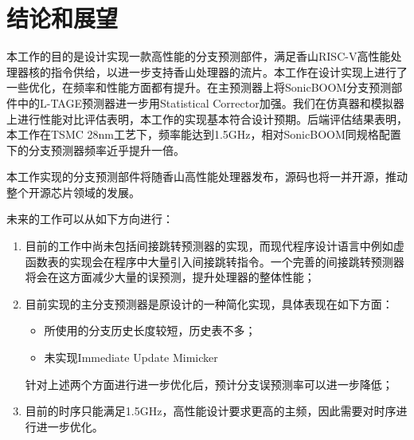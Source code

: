 \chapter{结论和展望}\label{chap:result}
本工作的目的是设计实现一款高性能的分支预测部件，满足香山RISC-V高性能处理器核的指令供给，以进一步支持香山处理器的流片。本工作在设计实现上进行了一些优化，在频率和性能方面都有提升。在主预测器上将SonicBOOM\cite{zhao2020sonicboom}分支预测部件中的L-TAGE预测器\cite{seznec2011new}进一步用Statistical Corrector\cite{seznec2014tage}加强。我们在仿真器和模拟器上进行性能对比评估表明，本工作的实现基本符合设计预期。后端评估结果表明，本工作在TSMC 28nm工艺下，频率能达到1.5GHz，相对SonicBOOM同规格配置下的分支预测器频率近乎提升一倍。

本工作实现的分支预测部件将随香山高性能处理器发布，源码也将一并开源，推动整个开源芯片领域的发展。

未来的工作可以从如下方向进行：
\begin{enumerate}
    \item 目前的工作中尚未包括间接跳转预测器的实现，而现代程序设计语言中例如虚函数表的实现会在程序中大量引入间接跳转指令。一个完善的间接跳转预测器将会在这方面减少大量的误预测，提升处理器的整体性能；
    \item 目前实现的主分支预测器是原设计的一种简化实现，具体表现在如下方面：
    \begin{itemize}
        \item 所使用的分支历史长度较短，历史表不多；
        \item 未实现Immediate Update Mimicker\cite{seznec2011new}
    \end{itemize}
    针对上述两个方面进行进一步优化后，预计分支误预测率可以进一步降低；
    \item 目前的时序只能满足1.5GHz，高性能设计要求更高的主频，因此需要对时序进行进一步优化。
\end{enumerate}